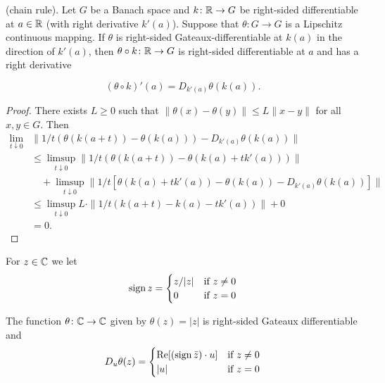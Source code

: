 \begin{proposition} \label{prop:b2-2.3}
(chain rule). Let $G$ be a Banach space and $k \colon \mathbb{R} \to G$ be right-sided differentiable at $a \in \mathbb{R}$ (with right derivative $k'(a)$).
Suppose that $\theta \colon G \to G$ is a Lipschitz continuous mapping.
If $\theta$ is right-sided Gateaux-differentiable at $k(a)$ in the direction of $k'(a)$, then $\theta \circ k \colon \mathbb{R} \to G$ is right-sided differentiable at $a$ and has a right derivative

\begin{equation}\label{eq:b2-2.4}
(\theta \circ k)'(a) = D_{k'(a)}\theta(k(a)).
\end{equation}
\end{proposition}
\begin{proof}
There exists $L \geq 0$ such that $\|\theta(x) - \theta(y)\| \leq L\|x - y\|$ for all $x,y \in G$.
Then
\[
\begin{array}{lll}
\lim_{t \downarrow 0} &\|1/t (\theta(k(a+t)) - \theta(k(a))) - D_{k'(a)}\theta(k(a))\| \\
&\leq \limsup_{t \downarrow 0} \|1/t (\theta(k(a+t)) - \theta(k(a)+tk'(a)))\| \\
&\quad + \limsup_{t \downarrow 0} \|1/t [\theta(k(a)+tk'(a)) - \theta(k(a)) - D_{k'(a)}\theta(k(a))]\| \\
&\leq \limsup_{t \downarrow 0} L \cdot \|1/t (k(a+t) - k(a)-tk'(a))\| + 0 \\
&= 0.
\end{array}
\]
\end{proof}
For $z \in \mathbb{C}$ we let
\begin{equation}\label{eq:b2-2.5}
\operatorname{sign} z = \begin{cases}
    z/|z| & \text{if } z \neq 0 \\
    0 & \text{if } z = 0
\end{cases}
\end{equation}

\begin{lemma}\label{lem:b2-2.4}
The function $\theta \colon \mathbb{C} \to \mathbb{C}$ given by $\theta(z) = |z|$ is right-sided Gateaux differentiable and
\begin{equation}\label{eq:b2-2.6}
D_{u}\theta(z) = \begin{cases}
    \mathop{}\!\mathrm{Re}[(\operatorname{sign} \bar{z}) \cdot u] & \text{if } z \neq 0 \\
    |u| & \text{if } z = 0
\end{cases}
\end{equation}
\end{lemma}

